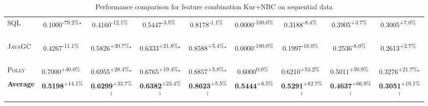 \begin{table}[htbp]
\begin{tabular}{l|cccc|cccc}
\textsc{SQL} & \cellcolor{red!30}0.1000\textsuperscript{-79.2\%}$^\star$ & \cellcolor{red!30}0.4160\textsuperscript{-12.1\%}$^{\,\,\,}$ & \cellcolor{red!30}0.5447\textsuperscript{-3.5\%}$^{\,\,\,}$ & \cellcolor{red!30}0.8178\textsuperscript{-1.1\%}$^{\,\,\,}$ & \cellcolor{red!30}0.0000\textsuperscript{-100.0\%}$^{\,\,\,}$ & \cellcolor{red!30}0.3188\textsuperscript{-8.4\%}$^{\,\,\,}$ & \cellcolor{green!30}0.3905\textsuperscript{+3.7\%}$^{\,\,\,}$ & \cellcolor{green!30}0.3005\textsuperscript{+7.0\%}$^{\,\,\,}$ \\
\textsc{JavaGC} & \cellcolor{red!30}0.4267\textsuperscript{-11.1\%}$^{\,\,\,}$ & \cellcolor{green!30}0.5826\textsuperscript{+30.7\%}$^\star$ & \cellcolor{green!30}0.6333\textsuperscript{+21.8\%}$^\star$ & \cellcolor{green!30}0.8588\textsuperscript{+5.4\%}$^\star$ & \cellcolor{red!30}0.0000\textsuperscript{-100.0\%}$^{\,\,\,}$ & \cellcolor{red!30}0.1997\textsuperscript{-18.0\%}$^{\,\,\,}$ & \cellcolor{red!30}0.2536\textsuperscript{-8.0\%}$^{\,\,\,}$ & \cellcolor{green!30}0.2613\textsuperscript{+2.7\%}$^{\,\,\,}$ \\
\textsc{Polly} & \cellcolor{green!30}0.7000\textsuperscript{+40.0\%}$^{\,\,\,}$ & \cellcolor{green!30}0.6955\textsuperscript{+28.4\%}$^\star$ & \cellcolor{green!30}0.6765\textsuperscript{+19.4\%}$^\star$ & \cellcolor{green!30}0.8857\textsuperscript{+5.8\%}$^\star$ & \cellcolor{red!30}0.6000\textsuperscript{0.0\%}$^{\,\,\,}$ & \cellcolor{green!30}0.6210\textsuperscript{+53.2\%}$^{\,\,\,}$ & \cellcolor{green!30}0.5011\textsuperscript{+50.9\%}$^{\,\,\,}$ & \cellcolor{green!30}0.3276\textsuperscript{+21.7\%}$^\star$ \\
\hline
\textbf{Average} & \cellcolor{green!30}\textbf{0.5198}\textsuperscript{+14.1\%}$^{\,\,\,}$ & \cellcolor{green!30}\textbf{0.6299}\textsuperscript{+33.7\%}$^\dagger$ & \cellcolor{green!30}\textbf{0.6382}\textsuperscript{+23.4\%}$^\dagger$ & \cellcolor{green!30}\textbf{0.8623}\textsuperscript{+5.5\%}$^\dagger$ & \cellcolor{green!30}\textbf{0.5444}\textsuperscript{+6.5\%}$^{\,\,\,}$ & \cellcolor{green!30}\textbf{0.5291}\textsuperscript{+82.7\%}$^\dagger$ & \cellcolor{green!30}\textbf{0.4637}\textsuperscript{+66.9\%}$^\dagger$ & \cellcolor{green!30}\textbf{0.3051}\textsuperscript{+19.1\%}$^\dagger$ \\
\hline
\end{tabular}
\caption{Performance comparison for feature combination Kur+NBC on sequential data}
\label{tab:combo_Kur_NBC_performance_sequential}
\end{table}
